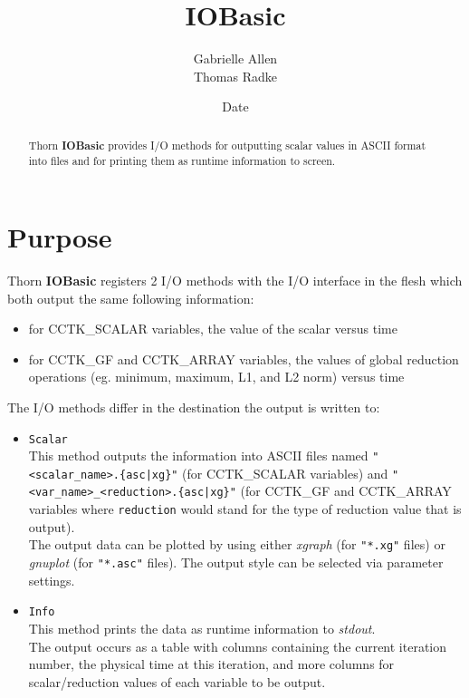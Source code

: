 \documentclass{article}
\begin{document}
\title{IOBasic}
\author{Gabrielle Allen \\ Thomas Radke}
\date{$ $Date$ $}

\maketitle

\begin{abstract}
Thorn {\bf IOBasic} provides I/O methods for outputting scalar values in
ASCII format into files and for printing them as runtime information to screen.
\end{abstract}


\section{Purpose}
Thorn {\bf IOBasic} registers 2 I/O methods with the I/O interface in the flesh
which both output the same following information:
%
\begin{itemize}
  \item for CCTK\_SCALAR variables, the value of the scalar versus time
  \item for CCTK\_GF and CCTK\_ARRAY variables, the values of global reduction
        operations (eg. minimum, maximum, L1, and L2 norm) versus time
\end{itemize}
%
The I/O methods differ in the destination the output is written to:
\begin{itemize}
  \item{\tt Scalar}\\
    This method outputs the information into ASCII files named {\tt "<scalar\_name>.\{asc|xg\}"} (for CCTK\_SCALAR variables) and {\tt "<var\_name>\_<reduction>.\{asc|xg\}"}
    (for CCTK\_GF and CCTK\_ARRAY variables where {\tt reduction} would stand
    for the type of reduction value that is output).\\
    The output data can be plotted by using either {\it xgraph} (for {\tt "*.xg"} files) or
    {\it gnuplot} (for {\tt "*.asc"} files). The output style can be selected via parameter settings.
  \item {\tt Info}\\
    This method prints the data as runtime information to {\it stdout}.\\
    The output occurs as a table with columns containing the current iteration
    number, the physical time at this iteration, and more columns for
    scalar/reduction values of each variable to be output.\\
\end{itemize}
%
%
\end{document}
